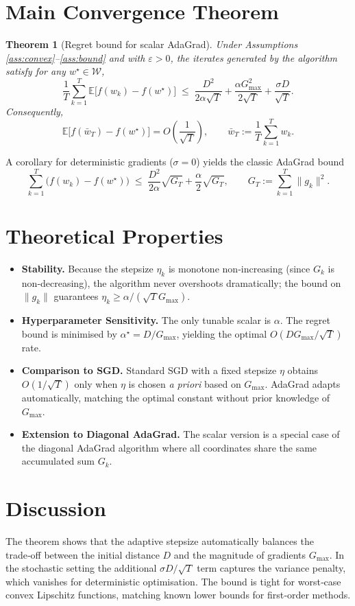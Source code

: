 \documentclass{article}
\newtheorem{theorem}{Theorem}
\newcommand{\E}{\mathbb{E}}
\begin{document}
\section*{Main Convergence Theorem}
\begin{theorem}[Regret bound for scalar AdaGrad]\label{thm:regret}
Under Assumptions \ref{ass:convex}--\ref{ass:bound} and with $\varepsilon>0$, the iterates generated by the algorithm satisfy for any $w^{\star}\in\mathcal{W}$,
\[
\frac{1}{T}\sum_{k=1}^{T}\E\!\big[ f(w_k)-f(w^{\star})\big]
\;\le\;
\frac{D^{2}}{2\alpha\sqrt{T}}+\frac{\alpha G_{\max}^{2}}{2\sqrt{T}}+\frac{\sigma D}{\sqrt{T}} .
\]
Consequently,
\[
\E\!\big[f(\bar w_T)-f(w^{\star})\big]=O\!\left(\frac{1}{\sqrt{T}}\right),\qquad
\bar w_T:=\frac{1}{T}\sum_{k=1}^{T}w_k .
\]
\end{theorem}
A corollary for deterministic gradients ($\sigma=0$) yields the classic AdaGrad bound
\[
\sum_{k=1}^{T}\big(f(w_k)-f(w^{\star})\big)
\;\le\;
\frac{D^{2}}{2\alpha}\sqrt{G_T}+\frac{\alpha}{2}\sqrt{G_T},
\qquad 
G_T:=\sum_{k=1}^{T}\|g_k\|^{2}.
\]

\section*{Theoretical Properties}
\begin{itemize}
\item \textbf{Stability.} Because the stepsize $\eta_k$ is monotone non‑increasing (since $G_k$ is non‑decreasing), the algorithm never overshoots dramatically; the bound on $\|g_k\|$ guarantees $\eta_k\ge \alpha/(\sqrt{T}G_{\max})$.
\item \textbf{Hyperparameter Sensitivity.} The only tunable scalar is $\alpha$. The regret bound is minimised by $\alpha^{\star}=D/G_{\max}$, yielding the optimal $O(DG_{\max}/\sqrt{T})$ rate.
\item \textbf{Comparison to SGD.} Standard SGD with a fixed stepsize $\eta$ obtains $O(1/\sqrt{T})$ only when $\eta$ is chosen \emph{a priori} based on $G_{\max}$. AdaGrad adapts automatically, matching the optimal constant without prior knowledge of $G_{\max}$.
\item \textbf{Extension to Diagonal AdaGrad.} The scalar version is a special case of the diagonal AdaGrad algorithm where all coordinates share the same accumulated sum $G_k$.
\end{itemize}

\section*{Discussion}
The theorem shows that the adaptive stepsize automatically balances the trade‑off between the initial distance $D$ and the magnitude of gradients $G_{\max}$. In the stochastic setting the additional $\sigma D/\sqrt{T}$ term captures the variance penalty, which vanishes for deterministic optimisation. The bound is tight for worst‑case convex Lipschitz functions, matching known lower bounds for first‑order methods.
\end{document}
